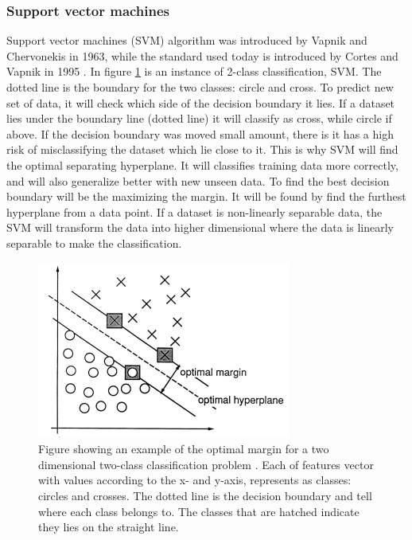 \documentclass[USenglish]{ifimaster}  %
\begin{document}
	\subsubsection{Support vector machines}
	Support vector machines (SVM) algorithm was introduced by Vapnik and Chervonekis in 1963, while the standard used today is introduced by Cortes and Vapnik in 1995 \cite{Cortes1995}. In figure \ref{fig:SVM} is an instance of 2-class classification, SVM. The dotted line is the boundary for the two classes: circle and cross. To predict new set of data, it will check which side of the decision boundary it lies. If a dataset lies under the boundary line (dotted line) it will classify as cross, while circle if above. If the decision boundary was moved small amount, there is it has a high risk of misclassifying the dataset which lie close to it. This is why SVM will find the optimal separating hyperplane. It will classifies training data more correctly, and will also generalize better with new unseen data. To find the best decision boundary will be the maximizing the margin. It will be found by find the furthest hyperplane from a data point. If a dataset is non-linearly separable data, the SVM will transform the data into higher dimensional where the data is linearly separable to make the classification.
	
	
	\begin{figure}[h]
		\centering
		\includegraphics{Figures/SVM.PNG}
		\caption{Figure showing an example of the optimal margin for a two dimensional
			two-class classification problem \cite{Cortes1995}. Each of features vector with values according to the x- and y-axis, represents as classes: circles and crosses. The dotted line is the decision boundary and tell where each class belongs to. The classes that are hatched indicate they lies on the straight line. }
		\label{fig:SVM}
	\end{figure}
	
\end{document}
